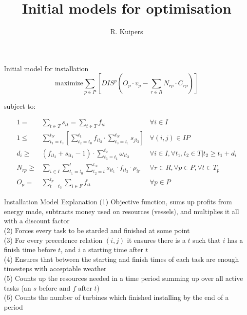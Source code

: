 \documentclass{beamer}
\title[Initial models for optimisation]{Initial models for optimisation}
\author{R. Kuipers}
\begin{document}
\begin{frame}
  \titlepage
\end{frame}

\begin{frame}{Initial model for installation}
\footnotesize
\begin{equation}
	\text{maximize} \sum_{p \in P} [ DIS^p (O_p \cdot v_p - \sum_{r \in R} N_{rp} \cdot C_{rp}) ]
\end{equation}

\bigskip
subject to:

\begin{align}
1 =& \sum_{t \in T} s_{it}	= \sum_{t \in T} f_{it}										&	\forall i \in I 						\\
1 \leq& \sum_{t_1 = t_0}^{t_N} [ \sum_{t_2 = t_0}^{t_1} f_{it_2} \cdot \sum_{t_3 = t_1}^{t_N} s_{jt_3} ]	&	\forall (i, j) \in IP					\\
d_i \geq& (f_{it_2} + s_{it_1} - 1) \cdot \sum_{t_3 = t_1}^{t_2} \omega_{it_3} 							& 	\forall i \in I, 	\forall t_1, t_2 \in T | t_2 \geq t_1 + d_i	\\
N_{rp} \geq& \sum_{i\in I} \sum_{t_1 = t_0}^t \sum_{t_2 = t}^{t_N} s_{it_1} \cdot f_{it_2} \cdot \rho_{ir}	& 	\forall r \in R, \forall p \in P, \forall t \in T_p 	\\
O_p =&  \sum_{t = t_0}^{t_p} \sum_{i \in F} f_{it}									&	\forall p \in P
\end{align}

\end{frame}

\begin{frame}{Installation Model Explanation}
(1) Objective function, sums up profits from energy made, subtracts money used on resources (vessels), and multiplies it all with a discount factor	\\
(2) Forces every task to be starded and finished at some point	\\
(3) For every precedence relation $(i, j)$ it ensures there is a $t$ such that $i$ has a finish time before $t$, and $i$ a starting time after $t$	\\
(4) Ensures that between the starting and finish times of each task are enough timesteps with acceptable weather	\\
(5) Counts up the resources needed in a time period summing up over all active tasks (an $s$ before and $f$ after $t$)	\\
(6) Counts the number of turbines which finished installing by the end of a period	
\end{frame}
\end{document}
